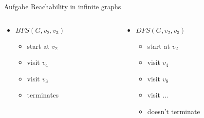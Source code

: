 \begin{frame}[allowframebreaks]{Aufgabe \thesection}{Reachability in infinite graphs}
\begin{solutionnoinc}
\begin{columns}
\begin{column}[t]{0.5\textwidth}
\begin{itemize}
        \end{itemize}
        \begin{columns}
          \begin{column}[t]{0.5\linewidth}
            \begin{itemize}
              \item $BFS(G,v_2, v_3)$
              \begin{itemize}
                \item start at $v_2$
                \item visit $v_4$
                \item visit $v_3$
                \item terminates
              \end{itemize}
            \end{itemize}
          \end{column}
          \begin{column}[t]{0.5\linewidth}
            \begin{itemize}
              \item $DFS(G, v_2, v_3)$
              \begin{itemize}
                \item start at $v_2$
                \item visit $v_4$
                \item visit $v_8$
                \item visit $\ldots$
                \item doesn't terminate
              \end{itemize}
            \end{itemize}
          \end{column}
        \end{columns}
      \end{column}
    \end{columns}
  \end{solutionnoinc}
\end{frame}
